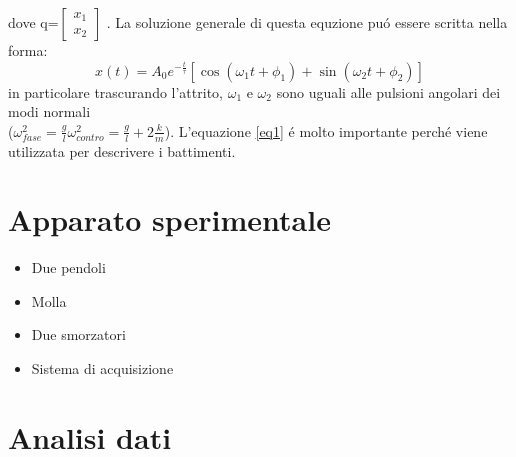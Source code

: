 \documentclass{exam}
\begin{document}
		dove q=$
		\begin{bmatrix}
			x_1 \\
			x_2
		\end{bmatrix}$
		. La soluzione generale di questa equzione pu\'o essere scritta nella forma:
		\begin{equation}
			\label{eq1}
			x(t)= A_0 e^{-\frac{t}{\tau}}[\cos(\omega_1 t + \phi_1) +\sin(\omega_2 t + \phi_2) ]
		\end{equation}
		in particolare trascurando l'attrito, $\omega_1$ e $\omega_2$ sono uguali alle pulsioni angolari dei modi normali\\($\omega_{fase}^2=\frac{g}{l} \omega_{contro}^2=\frac{g}{l}+2\frac{k}{m} $). L'equazione \ref{eq1} \'e molto importante perch\'e viene utilizzata per descrivere i battimenti.

	\section{Apparato sperimentale}
		\begin{itemize}
			\item Due pendoli
			\item Molla
			\item Due smorzatori
			\item Sistema di acquisizione
		\end{itemize}

	\section{Analisi dati}
\end{document}
